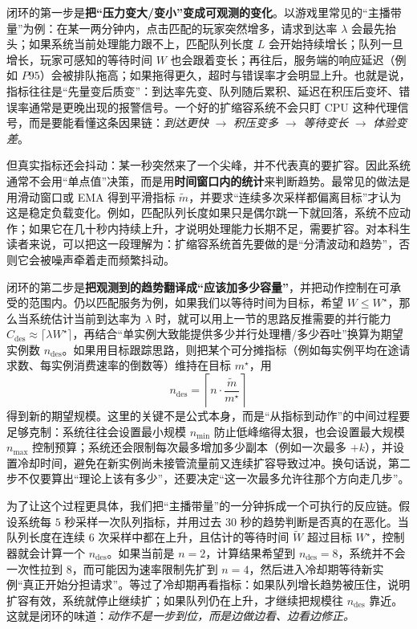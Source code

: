 闭环的第一步是\textbf{把“压力变大/变小”变成可观测的变化}。以游戏里常见的“主播带量”为例：在某一两分钟内，点击匹配的玩家突然增多，请求到达率 $\lambda$ 会最先抬头；如果系统当前处理能力跟不上，匹配队列长度 $L$ 会开始持续增长；队列一旦增长，玩家可感知的等待时间 $W$ 也会跟着变长；再往后，服务端的响应延迟（例如 $P95$）会被排队拖高；如果拖得更久，超时与错误率才会明显上升。也就是说，指标往往是“先量变后质变”：到达率先变、队列随后累积、延迟在积压后变坏、错误率通常是更晚出现的报警信号。一个好的扩缩容系统不会只盯 CPU 这种代理信号，而是要能看懂这条因果链：\emph{到达更快} $\rightarrow$ \emph{积压变多} $\rightarrow$ \emph{等待变长} $\rightarrow$ \emph{体验变差}。

但真实指标还会抖动：某一秒突然来了一个尖峰，并不代表真的要扩容。因此系统通常不会用“单点值”决策，而是用\textbf{时间窗口内的统计}来判断趋势。最常见的做法是用滑动窗口或 EMA 得到平滑指标 $\tilde{m}$，并要求“连续多次采样都偏离目标”才认为这是稳定负载变化。例如，匹配队列长度如果只是偶尔跳一下就回落，系统不应动作；如果它在几十秒内持续上升，才说明处理能力长期不足，需要扩容。对本科生读者来说，可以把这一段理解为：扩缩容系统首先要做的是“分清波动和趋势”，否则它会被噪声牵着走而频繁抖动。

闭环的第二步是\textbf{把观测到的趋势翻译成“应该加多少容量”}，并把动作控制在可承受的范围内。仍以匹配服务为例，如果我们以等待时间为目标，希望 $W\le W^\star$，那么当系统估计当前到达率为 $\lambda$ 时，就可以用上一节的思路反推需要的并行能力 $C_{\mathrm{des}}\approx \lceil \lambda W^\star\rceil$，再结合“单实例大致能提供多少并行处理槽/多少吞吐”换算为期望实例数 $n_{\mathrm{des}}$。如果用目标跟踪思路，则把某个可分摊指标（例如每实例平均在途请求数、每实例消费速率的倒数等）维持在目标 $m^\star$，用
\[
n_{\mathrm{des}}=\left\lceil n\cdot\frac{\tilde{m}}{m^\star}\right\rceil
\]
得到新的期望规模。这里的关键不是公式本身，而是“从指标到动作”的中间过程要足够克制：系统往往会设置最小规模 $n_{\min}$ 防止低峰缩得太狠，也会设置最大规模 $n_{\max}$ 控制预算；系统还会限制每次最多增加多少副本（例如一次最多 $+k$），并设置冷却时间，避免在新实例尚未接管流量前又连续扩容导致过冲。换句话说，第二步不仅要算出“理论上该有多少”，还要决定“这一次最多允许往那个方向走几步”。

为了让这个过程更具体，我们把“主播带量”的一分钟拆成一个可执行的反应链。假设系统每 $5$ 秒采样一次队列指标，并用过去 $30$ 秒的趋势判断是否真的在恶化。当队列长度在连续 $6$ 次采样中都在上升，且估计的等待时间 $\tilde{W}$ 超过目标 $W^\star$，控制器就会计算一个 $n_{\mathrm{des}}$。如果当前是 $n=2$，计算结果希望到 $n_{\mathrm{des}}=8$，系统并不会一次性拉到 8，而可能因为速率限制先扩到 $n=4$，然后进入冷却期等待新实例“真正开始分担请求”。等过了冷却期再看指标：如果队列增长趋势被压住，说明扩容有效，系统就停止继续扩；如果队列仍在上升，才继续把规模往 $n_{\mathrm{des}}$ 靠近。这就是闭环的味道：\emph{动作不是一步到位，而是边做边看、边看边修正。}

